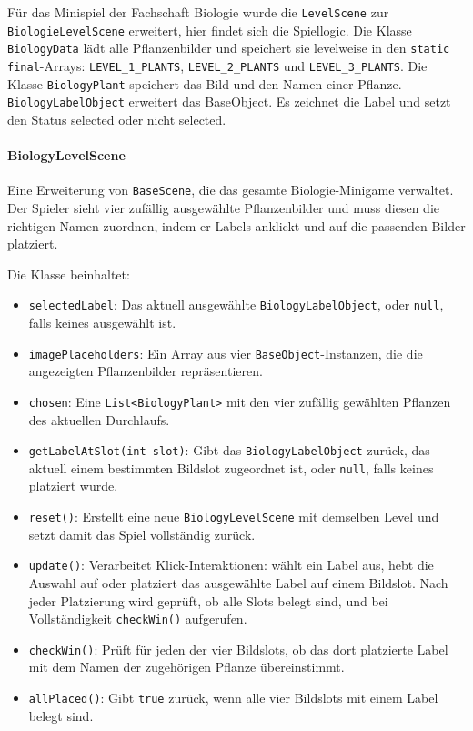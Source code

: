 \begin{sloppypar}
    Für das Minispiel der Fachschaft Biologie wurde die \texttt{LevelScene} zur \texttt{BiologieLevelScene} erweitert, hier findet sich die Spiellogic.
    Die Klasse \texttt{BiologyData} lädt alle Pflanzenbilder und speichert sie levelweise in den \texttt{static final}-Arrays: \texttt{LEVEL\_1\_PLANTS}, \texttt{LEVEL\_2\_PLANTS} und \texttt{LEVEL\_3\_PLANTS}.
    Die Klasse \texttt{BiologyPlant} speichert das Bild und den Namen einer Pflanze.
    \texttt{BiologyLabelObject} erweitert das BaseObject. Es zeichnet die Label und setzt den Status selected oder nicht selected.
\end{sloppypar}

\paragraph{BiologyLevelScene}
Eine Erweiterung von \texttt{BaseScene}, die das gesamte Biologie-Minigame verwaltet.
Der Spieler sieht vier zufällig ausgewählte Pflanzenbilder und muss diesen die richtigen Namen zuordnen, indem er Labels anklickt und auf die passenden Bilder platziert.

Die Klasse beinhaltet:
\begin{sloppypar}
    \begin{itemize}
        \item \texttt{selectedLabel}: Das aktuell ausgewählte \texttt{BiologyLabelObject}, oder \texttt{null}, falls keines ausgewählt ist.
        \item \texttt{imagePlaceholders}: Ein Array aus vier \texttt{BaseObject}-Instanzen, die die angezeigten Pflanzenbilder repräsentieren.
        \item \texttt{chosen}: Eine \texttt{List<BiologyPlant>} mit den vier zufällig gewählten Pflanzen des aktuellen Durchlaufs.
        \item \texttt{getLabelAtSlot(int slot)}: Gibt das \texttt{BiologyLabelObject} zurück, das aktuell einem bestimmten Bildslot zugeordnet ist, oder \texttt{null}, falls keines platziert wurde.
        \item \texttt{reset()}: Erstellt eine neue \texttt{BiologyLevelScene} mit demselben Level und setzt damit das Spiel vollständig zurück.
        \item \texttt{update()}: Verarbeitet Klick-Interaktionen: wählt ein Label aus, hebt die Auswahl auf oder platziert das ausgewählte Label auf einem Bildslot. Nach jeder Platzierung wird geprüft, ob alle Slots belegt sind, und bei Vollständigkeit \texttt{checkWin()} aufgerufen.
        \item \texttt{checkWin()}: Prüft für jeden der vier Bildslots, ob das dort platzierte Label mit dem Namen der zugehörigen Pflanze übereinstimmt.
        \item \texttt{allPlaced()}: Gibt \texttt{true} zurück, wenn alle vier Bildslots mit einem Label belegt sind.
    \end{itemize}
\end{sloppypar}

